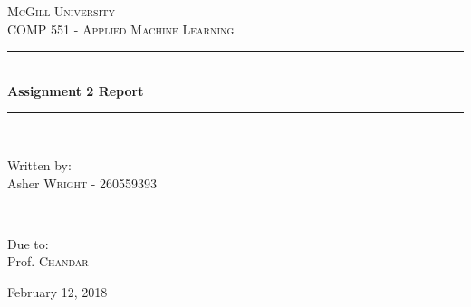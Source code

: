 \documentclass[11pt]{article}
\begin{document}
\begin{titlepage} %
	\newcommand{\HRule}{\rule{\linewidth}{0.5mm}} %
	
	\center %
	
	
	\textsc{\LARGE McGill University}\\[1.5cm] %

	\textsc{\large COMP 551 - Applied Machine Learning}\\[0.5cm] %
	
	
	\HRule\\[0.4cm]
	
	{\huge\bfseries Assignment 2 Report}\\[0.4cm] %
	
	\HRule\\[1.5cm]
	
	
	\begin{minipage}{0.5\textwidth}
		\begin{flushleft}
			\large
			Written by:\\
			Asher \textsc{Wright} - {\small 260559393}
		\end{flushleft}
	\end{minipage}
	~
	\begin{minipage}{0.4\textwidth}
		\begin{flushright}
			\large
			Due to:\\
			Prof.  \textsc{Chandar} 
		\end{flushright}
	\end{minipage}
	

	
	
	\vfill\vfill\vfill %
	
	{\large February 12, 2018} 
	
	\vfill %
\end{titlepage}
\end{document}
